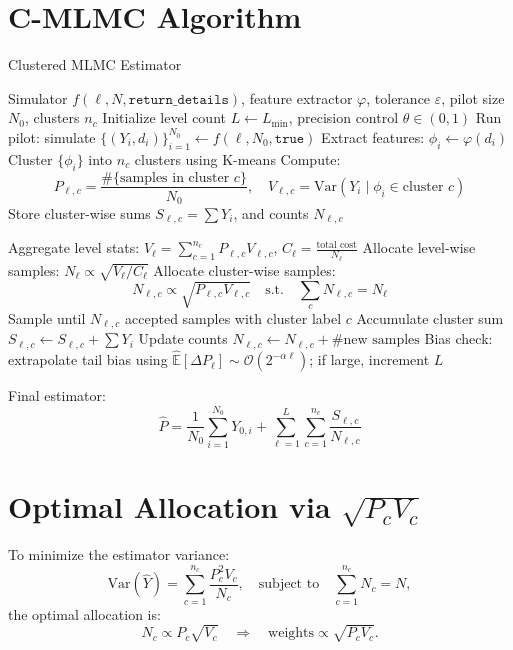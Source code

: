 \documentclass{article}
\begin{document}
\section{C-MLMC Algorithm}
\begin{algorithm}[H]
\caption{Clustered MLMC Estimator}
\label{alg:cmlmc}
\begin{algorithmic}[1]
\REQUIRE Simulator \( f(\ell, N, \texttt{return\_details}) \), feature extractor \( \varphi \), tolerance \( \varepsilon \), pilot size \( N_0 \), clusters \( n_c \)
\STATE Initialize level count \( L \leftarrow L_{\min} \), precision control \( \theta \in (0,1) \)
    \STATE Run pilot: simulate \( \{(Y_i, d_i)\}_{i=1}^{N_0} \leftarrow f(\ell, N_0, \texttt{true}) \)
    \STATE Extract features: \( \phi_i \leftarrow \varphi(d_i) \)
    \STATE Cluster \( \{\phi_i\} \) into \( n_c \) clusters using K-means
    \STATE Compute:
    \[
    P_{\ell,c} = \frac{\#\{\text{samples in cluster } c\}}{N_0}, \quad
    V_{\ell,c} = \mathrm{Var}\left(Y_i \mid \phi_i \in \text{cluster } c\right)
    \]
    \STATE Store cluster-wise sums \( S_{\ell,c} = \sum Y_i \), and counts \( N_{\ell,c} \)
\ENDFOR

    \STATE Aggregate level stats: \( V_\ell = \sum_{c=1}^{n_c} P_{\ell,c} V_{\ell,c} \), \( C_\ell = \frac{\text{total cost}}{N_\ell} \)
    \STATE Allocate level-wise samples: \( N_\ell \propto \sqrt{V_\ell / C_\ell} \)
    \STATE Allocate cluster-wise samples:
    \[
    N_{\ell,c} \propto \sqrt{P_{\ell,c} V_{\ell,c}} \quad \text{s.t.} \quad \sum_c N_{\ell,c} = N_\ell
    \]
        \STATE Sample until \( N_{\ell,c} \) accepted samples with cluster label \( c \)
        \STATE Accumulate cluster sum \( S_{\ell,c} \leftarrow S_{\ell,c} + \sum Y_i \)
        \STATE Update counts \( N_{\ell,c} \leftarrow N_{\ell,c} + \#\text{new samples} \)
    \ENDFOR
    \STATE Bias check: extrapolate tail bias using \( \widehat{\mathbb{E}}[\Delta P_\ell] \sim \mathcal{O}(2^{-\alpha \ell}) \); if large, increment \( L \)
\ENDWHILE

\STATE Final estimator:
\[
\hat{P} = \frac{1}{N_0} \sum_{i=1}^{N_0} Y_{0,i} + \sum_{\ell = 1}^{L} \sum_{c=1}^{n_c} \frac{S_{\ell,c}}{N_{\ell,c}}
\]
\end{algorithmic}
\end{algorithm}

\section{Optimal Allocation via \(\sqrt{P_c V_c}\)}
To minimize the estimator variance:
\[
\mathrm{Var}(\hat{Y}) = \sum_{c=1}^{n_c} \frac{P_c^2 V_c}{N_c}, \quad \text{subject to} \quad \sum_{c=1}^{n_c} N_c = N,
\]
the optimal allocation is:
\[
N_c \propto P_c \sqrt{V_c} \quad \Rightarrow \quad \text{weights} \propto \sqrt{P_c V_c}.
\]
\end{document}
